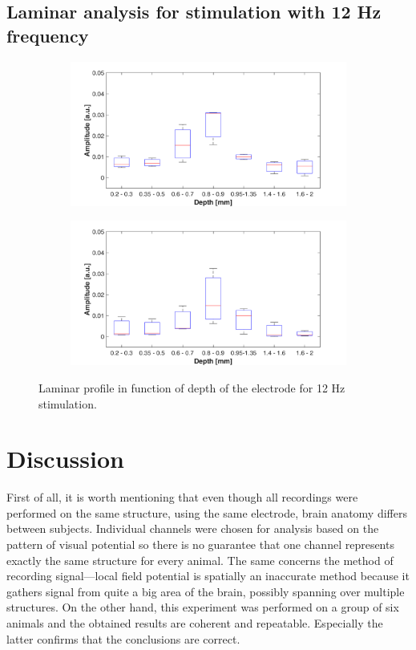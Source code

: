 \documentclass{pracalicmgr}
\begin{document}
\section{Laminar analysis for stimulation with 12 Hz frequency}  
   	\begin{figure}[H]
	\begin{subfigure}{.5\textwidth}
		\centering
		\includegraphics[width=1.\linewidth]{profile_12Hz_wid.png}
		\caption{}
		\label{rys:profil_12Hz_wid1}
	\end{subfigure}%
	\begin{subfigure}{.5\textwidth}
		\centering
		\includegraphics[width=1.\linewidth]{profile_12Hz_wid2.png}
		\caption{}
		\label{rys:profil_12Hz_wid2}
	\end{subfigure}
	
	\caption{Laminar profile in function of depth of the electrode for 12 Hz stimulation.}
	\label{rys:profil_12Hz_wid}
\end{figure}
    \chapter{Discussion}
    
    First of all, it is worth mentioning that even though all recordings were performed on the same structure, using the same electrode, brain anatomy differs between subjects. Individual channels were chosen for analysis based on the pattern of visual potential so there is no guarantee that one channel represents exactly the same structure for every animal. The same concerns the method of recording signal---local field potential is spatially an inaccurate method because it gathers signal from quite a big area of the brain, possibly spanning over multiple structures. On the other hand, this experiment was performed on a group of six animals and the obtained results are coherent and repeatable. Especially the latter confirms that the conclusions are correct. 
    
\end{document}
